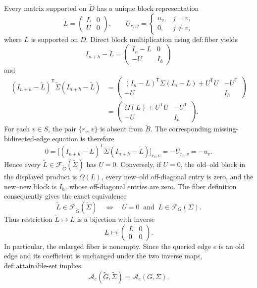 Every matrix supported on \(\widetilde D\) has a unique block representation
\[
\widetilde L=
\begin{pmatrix}
L&0\\
U&0
\end{pmatrix},
\qquad
U_{r_v,j}=
\begin{cases}
u_v,&j=v,\\
0,&j\ne v,
\end{cases}
\]
where \(L\) is supported on \(D\). Direct block multiplication using \(\mathrm{def:fiber}\) yields
\[
I_{n+h}-\widetilde L=
\begin{pmatrix}
I_n-L&0\\
-U&I_h
\end{pmatrix}
\]
and
\[
\begin{aligned}
(I_{n+h}-\widetilde L)^{\mathsf T}
\widetilde\Sigma
(I_{n+h}-\widetilde L)
&=
\begin{pmatrix}
(I_n-L)^{\mathsf T}\Sigma(I_n-L)+U^{\mathsf T}U&-U^{\mathsf T}\\
-U&I_h
\end{pmatrix}\\
&=
\begin{pmatrix}
\Omega(L)+U^{\mathsf T}U&-U^{\mathsf T}\\
-U&I_h
\end{pmatrix}.
\end{aligned}
\]
For each \(v\in S\), the pair \(\{r_v,v\}\) is absent from \(\widetilde B\). The corresponding missing-bidirected-edge equation is therefore
\[
0=\bigl[(I_{n+h}-\widetilde L)^{\mathsf T}
\widetilde\Sigma(I_{n+h}-\widetilde L)\bigr]_{r_v,v}
=-U_{r_v,v}=-u_v.
\]
Hence every \(\widetilde L\in\mathcal F_{\widetilde G}(\widetilde\Sigma)\) has \(U=0\). Conversely, if \(U=0\), the old--old block in the displayed product is \(\Omega(L)\), every new--old off-diagonal entry is zero, and the new--new block is \(I_h\), whose off-diagonal entries are zero. The fiber definition consequently gives the exact equivalence
\[
\widetilde L\in\mathcal F_{\widetilde G}(\widetilde\Sigma)
\quad\Longleftrightarrow\quad
U=0\ \text{ and }\ L\in\mathcal F_G(\Sigma).
\]
Thus restriction \(\widetilde L\mapsto L\) is a bijection with inverse
\[
L\longmapsto
\begin{pmatrix}
L&0\\
0&0
\end{pmatrix}.
\]
In particular, the enlarged fiber is nonempty. Since the queried edge \(e\) is an old edge and its coefficient is unchanged under the two inverse maps, \(\mathrm{def:attainable\mbox{-}set}\) implies
\[
\mathcal A_e(\widetilde G,\widetilde\Sigma)
=\mathcal A_e(G,\Sigma).
\]


